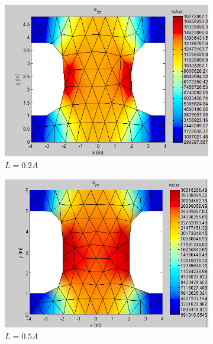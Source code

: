 \documentclass[paper=a4, fontsize=11pt]{scrartcl} %
\numberwithin{equation}{section} %
\numberwithin{figure}{section} %
\numberwithin{table}{section} %
\begin{document}
\begin{figure}[ht]
	\begin{subfigure}[b]{0.45\textwidth}
		\includegraphics[width=\textwidth]{stress02.png}
		\caption{$L = 0.2 A$}
	\end{subfigure}
	\hfill
	\begin{subfigure}[b]{0.45\textwidth}
		\includegraphics[width=\textwidth]{stress05.png}
		\caption{$L = 0.5 A$}
	\end{subfigure}
	\\
	\begin{subfigure}[b]{0.45\textwidth}

\end{subfigure}
\end{figure}
\end{document}
